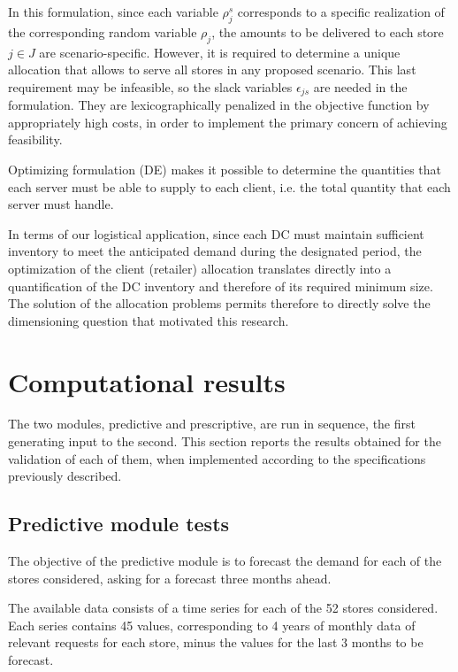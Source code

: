\documentclass[ijoc,sglanonrev]{informs4}
\begin{document}
In this formulation, since each variable $\rho_j^s$ corresponds to a specific realization of the corresponding random variable $\rho_j$, the amounts to be delivered to each store $j \in J$ are scenario-specific. However, it is required to determine a unique allocation that allows to serve all stores in any proposed scenario. This last requirement may be infeasible, so the slack variables $\epsilon_{js}$ are needed in the formulation. They are lexicographically penalized in the objective function by appropriately high costs, in order to implement the primary concern of achieving feasibility.

Optimizing formulation (DE) makes it possible to determine the quantities that each server must be able to supply to each client, i.e. the total quantity that each server must handle. 

In terms of our logistical application, since each DC must maintain sufficient inventory to meet the anticipated demand during the designated period, the optimization of the client (retailer) allocation translates directly into a quantification of the DC inventory and therefore of its required minimum size. The solution of the allocation problems permits therefore to directly solve the dimensioning question that motivated this research.

\section{Computational results} \label{Sec:results}

The two modules, predictive and prescriptive, are run in sequence, the first generating input to the second. This section reports the results obtained for the validation of each of them, when implemented according to the specifications previously described.

\subsection{Predictive module tests} \label{Subsec:predictive}

The objective of the predictive module is to forecast the demand for each of the stores considered,  asking for a forecast three months ahead.

The available data consists of a time series for each of the 52 stores considered. Each series contains 45 values, corresponding to 4 years of monthly data of relevant requests for each store, minus the values for the last 3 months to be forecast.
\end{document}
